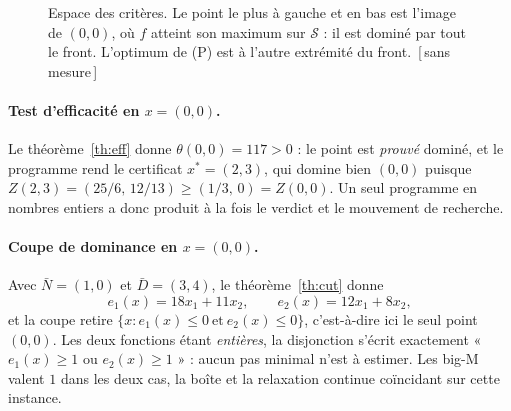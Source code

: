 \documentclass[11pt,a4paper]{article}
\theoremstyle{plain}
\theoremstyle{remark}
\newcommand{\Ecal}{\mathcal{E}}
\newcommand{\Scal}{\mathcal{S}}
\newcommand{\qs}{q^{\star}}
\newcommand{\confna}{\textsf{\footnotesize[\,sans mesure\,]}}
\begin{document}
\begin{figure}[H]
\centering
{}
\caption{Espace des critères. Le point le plus à gauche et en bas est
l'image de $(0,0)$, où $f$ atteint son maximum sur $\Scal$ : il est dominé
par tout le front. L'optimum de (P) est à l'autre extrémité du front.\ \confna}
\label{fig:ex2criteres}
\end{figure}

\paragraph{Test d'efficacité en $x=(0,0)$.} Le théorème~\ref{th:eff} donne
$\theta(0,0)=117>0$ : le point est \emph{prouvé} dominé, et le programme rend
le certificat $x^{\ast}=(2,3)$, qui domine bien $(0,0)$ puisque
$Z(2,3)=(25/6,\,12/13)\ge(1/3,\,0)=Z(0,0)$. Un seul programme en nombres
entiers a donc produit à la fois le verdict et le mouvement de recherche.

\paragraph{Coupe de dominance en $x=(0,0)$.} Avec
$\bar N=(1,0)$ et $\bar D=(3,4)$, le théorème~\ref{th:cut} donne
\[
  e_1(x)=18x_1+11x_2,\qquad e_2(x)=12x_1+8x_2,
\]
et la coupe retire $\{x : e_1(x)\le 0\ \text{et}\ e_2(x)\le 0\}$,
c'est-à-dire ici le seul point $(0,0)$. Les deux fonctions étant
\emph{entières}, la disjonction s'écrit exactement
« $e_1(x)\ge 1$ ou $e_2(x)\ge 1$ » : aucun pas minimal n'est à estimer. Les
big-M valent $1$ dans les deux cas, la boîte et la relaxation continue
coïncidant sur cette instance.
\end{document}
